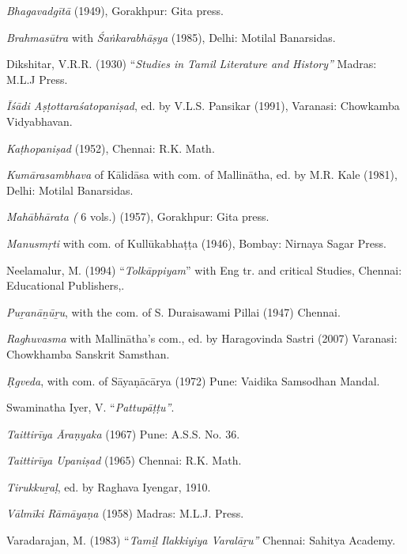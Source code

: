 \begin{thebibliography}{99}
 \textit{Bhagavadgītā} (1949), Gorakhpur: Gita press.

  \textit{Brahmasūtra} with \textit{Śaṅkarabhāṣya} (1985), Delhi: Motilal Banarsidas.

  Dikshitar, V.R.R. (1930) “\textit{Studies in Tamil Literature and History”} Madras: M.L.J Press.

  \textit{Īśādi Aṣṭottaraśatopaniṣad}, ed. by V.L.S. Pansikar (1991), Varanasi: Chowkamba Vidyabhavan.

  \textit{Kaṭhopaniṣad} (1952), Chennai: R.K. Math.

  \textit{Kumārasambhava} of Kālidāsa with com. of Mallinātha, ed. by M.R. Kale (1981), Delhi: Motilal Banarsidas.

  \textit{Mahābhārata (} 6 vols.) (1957), Gorakhpur: Gita press.

  \textit{Manusmṛti} with com. of Kullūkabhaṭṭa (1946), Bombay: Nirnaya Sagar Press.

  Neelamalur, M. (1994) “\textit{Tolkāppiyam}” with Eng tr. and critical Studies, Chennai: Educational Publishers,.

  \textit{Puṟanāṉūṟu}, with the com. of S. Duraisawami Pillai (1947) Chennai.

  \textit{Raghuvasma} with Mallinātha’s com., ed. by Haragovinda Sastri (2007) Varanasi: Chowkhamba Sanskrit Samsthan.

  \textit{Ṛgveda}, with com. of Sāyaṇācārya (1972) Pune: Vaidika Samsodhan Mandal.

  Swaminatha Iyer, V. “\textit{Pattupāṭṭu”}.

  \textit{Taittirīya Āraṇyaka} (1967) Pune: A.S.S. No. 36.

  \textit{Taittirīya Upaniṣad} (1965) Chennai: R.K. Math.

  \textit{Tirukkuṟaḷ}, ed. by Raghava Iyengar, 1910.

  \textit{Vālmīki Rāmāyaṇa} (1958) Madras: M.L.J. Press.

  Varadarajan, M. (1983) “\textit{Tamiḻ Ilakkiyiya Varalāṟu”} Chennai: Sahitya Academy.

 \end{thebibliography}

\theendnotes

